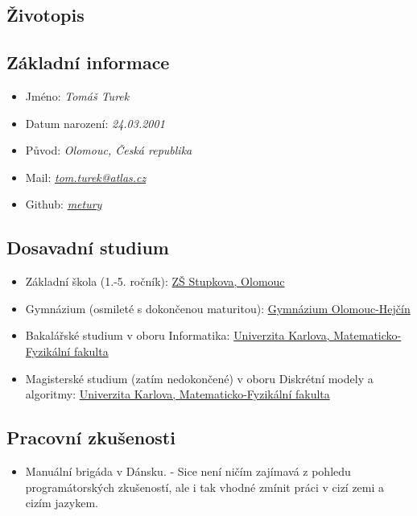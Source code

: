 \documentclass{article}
\begin{document}
\begin{center}
	\section*{Životopis}
\end{center}

\subsection*{Základní informace}

\begin{itemize}
	\item Jméno: \textit{Tomáš Turek}
	\item Datum narození: \textit{24.03.2001}
	\item Původ: \textit{Olomouc, Česká republika}
	\item Mail: \href{mailto:tom.turek@atlas.cz}{\textit{tom.turek@atlas.cz}}
	\item Github: \href{https://github.com/metury}{\textit{metury}}
\end{itemize}

\subsection*{Dosavadní studium}

\begin{itemize}
	\item Základní škola (1.-5. ročník): \href{https://zsstupkova.cz/}{ZŠ Stupkova, Olomouc}
	\item Gymnázium (osmileté s dokončenou maturitou): \href{https://www.gytool.cz/}{Gymnázium Olomouc-Hejčín}
	\item Bakalářské studium v oboru Informatika: \href{https://www.mff.cuni.cz/}{Univerzita Karlova, Matematicko-Fyzikální fakulta}
	\item Magisterské studium (zatím nedokončené) v oboru Diskrétní modely a algoritmy: \href{https://www.mff.cuni.cz/}{Univerzita Karlova, Matematicko-Fyzikální fakulta}
\end{itemize}

\subsection*{Pracovní zkušenosti}

\begin{itemize}
\item Manuální brigáda v Dánsku. - Sice není ničím zajímavá z pohledu programátorských zkušeností, ale i tak vhodné zmínit práci v cizí zemi a cizím jazykem.
\end{itemize}
\end{document}

